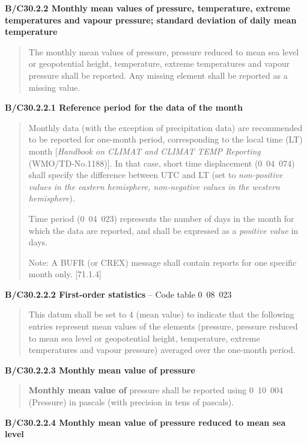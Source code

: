 \textbf{B/C30.2.2 Monthly mean values of pressure, temperature, extreme temperatures and vapour pressure; standard deviation of daily mean temperature}

\begin{quote}
The monthly mean values of pressure, pressure reduced to mean sea level or geopotential height, temperature, extreme temperatures and vapour pressure shall be reported. Any missing element shall be reported as a missing value.
\end{quote}

\textbf{B/C30.2.2.1 Reference period for the data of the month}

\begin{quote}
Monthly data (with the exception of precipitation data) are recommended to be reported for one-month period, corresponding to the local time (LT) month {[}\emph{Handbook on CLIMAT and CLIMAT TEMP Reporting} (WMO/TD-No.1188){]}. In that case, short time displacement (0~04~074) shall specify the difference between UTC and LT (set to \emph{non-positive values in the eastern hemisphere, non-negative values in the western hemisphere}).

Time period (0~04~023) represents the number of days in the month for which the data are reported, and shall be expressed as a \emph{positive value} in days.

Note: A BUFR (or CREX) message shall contain reports for one specific month only. {[}71.1.4{]}
\end{quote}

\textbf{B/C30.2.2.2 First-order statistics} -- Code table 0~08~023

\begin{quote}
This datum shall be set to 4 (mean value) to indicate that the following entries represent mean values of the elements (pressure, pressure reduced to mean sea level or geopotential height, temperature, extreme temperatures and vapour pressure) averaged over the one-month period.
\end{quote}

\textbf{B/C30.2.2.3 Monthly mean value of pressure}

\begin{quote}
\textbf{Monthly mean value of} pressure shall be reported using 0~10~004 (Pressure) in pascals (with precision in tens of pascals).
\end{quote}

\textbf{B/C30.2.2.4 Monthly mean value of pressure reduced to mean sea level}


